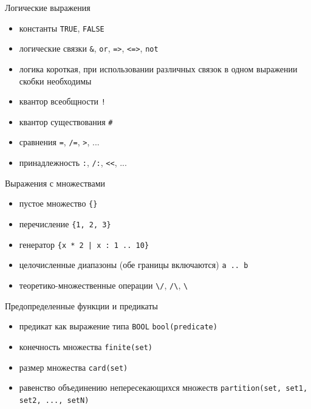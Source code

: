 \documentclass[hyperref={unicode=true}]{beamer}
\begin{document}
	\begin{frame}[fragile]{Логические выражения}
		\begin{itemize}
			\item константы \verb|TRUE|, \verb|FALSE|
			\item логические связки \verb|&|, \verb|or|,
			      \verb|=>|, \verb|<=>|, \verb|not|
			\item логика короткая, при использовании
			      различных связок в одном выражении
			      скобки необходимы
			\item квантор всеобщности \verb|!|
			\item квантор существования \verb|#|
			\item сравнения \verb|=|, \verb|/=|, \verb|>|, ...
			\item принадлежность \verb|:|, \verb|/:|, \verb|<<|, ...
		\end{itemize}
	\end{frame}

	\begin{frame}[fragile]{Выражения с множествами}
		\begin{itemize}
			\item пустое множество \verb|{}|
			\item перечисление \verb|{1, 2, 3}|
			\item генератор \verb`{x * 2 | x : 1 .. 10}`
			\item целочисленные диапазоны (обе границы включаются) \verb|a .. b|
			\item теоретико-множественные операции \verb|\/|, \verb|/\|, \verb|\|
		\end{itemize}
	\end{frame}

	\begin{frame}[fragile]{Предопределенные функции и предикаты}
		\begin{itemize}
			\item предикат как выражение типа \texttt{BOOL} \verb|bool(predicate)|
			\item конечность множества \verb|finite(set)|
			\item размер множества \verb|card(set)|
			\item равенство объединению непересекающихся множеств
			      \verb|partition(set, set1, set2, ..., setN)|
		\end{itemize}
	\end{frame}
\end{document}

